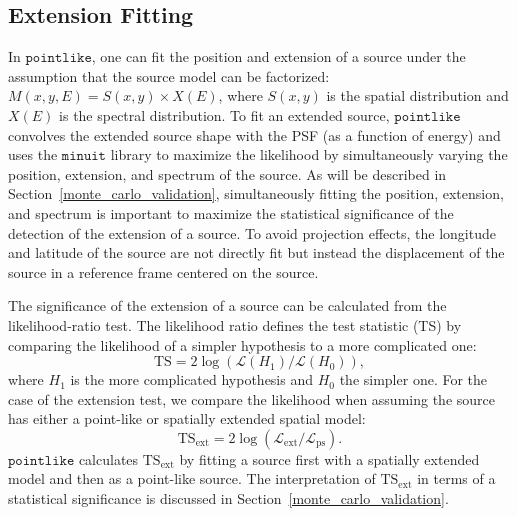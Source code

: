 \documentclass[12pt,preprint]{aastex}
\newcommand{\tsext}{{\ensuremath{\text{TS}_{\text{ext}}}}\xspace}
\newcommand{\likelihood}{\ensuremath{\mathcal{L}}\xspace}
\newcommand{\ts}{\text{TS}\xspace}
\newcommand{\pointlike}{\ensuremath{\mathtt{pointlike}}\xspace}
\newcommand{\minuit}{\ensuremath{\mathtt{minuit}}\xspace}
\begin{document}
\subsection{Extension Fitting}
\label{extension_fitting}

In \pointlike, one can fit the position and extension 
of a source under the assumption that the source model
can be factorized:
$M(x,y,E)=S(x,y)\times X(E)$, where $S(x,y)$ is the spatial distribution
and $X(E)$ is the spectral distribution.  To fit an extended source,
\pointlike convolves the extended source shape with the PSF (as a function
of energy) and uses the \minuit library \citep{minuit_documentation}
to maximize the likelihood by simultaneously varying the position,
extension, and spectrum of the source.  As will be described in
Section~\ref{monte_carlo_validation}, simultaneously fitting the
position, extension, and spectrum is important to maximize
the statistical significance of the detection of the extension of a source.
To avoid projection effects, the longitude and latitude 
of the source are
not directly fit but instead the displacement of the source 
in a reference frame centered on the source.

The significance of the extension of a source can be calculated from the
likelihood-ratio test. The likelihood ratio defines the
test statistic (TS) by comparing the likelihood of a simpler hypothesis to
a more complicated one:
\begin{equation}
  \ts=2\log(\likelihood(H_1)/\likelihood(H_0)),
\end{equation}
where $H_1$ is the more complicated hypothesis and $H_0$ the simpler one.
For the case of the extension test, we compare the likelihood
when assuming the source has either a point-like or spatially extended spatial model:
\begin{equation}
  \tsext=2\log(\likelihood_\text{ext}/\likelihood_\text{ps}).
\end{equation}
\pointlike calculates \tsext by fitting a source first with a spatially
extended model and then as a point-like source.  The interpretation
of \tsext in terms of a statistical significance is discussed in
Section~\ref{monte_carlo_validation}.
\end{document}
